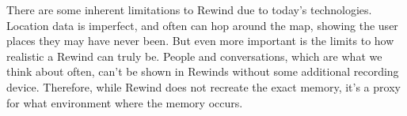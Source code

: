 \documentclass{sigchi}
\begin{document}



There are some inherent limitations to Rewind due to today's technologies. Location data is imperfect, and often can hop around the map, showing the user places they may have never been. But even more important is the limits to how realistic a Rewind can truly be. People and conversations, which are what we think about often, can't be shown in Rewinds without some additional recording device. Therefore, while Rewind does not recreate the exact memory, it's a proxy for what environment where the memory occurs.
\end{document}
